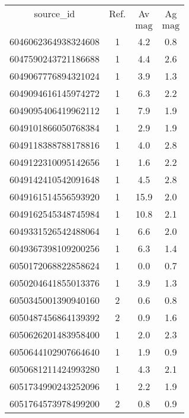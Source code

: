 \begin{table}
\begin{tabular}{cccc}
source_id & Ref. & Av & Ag \\
 &  & $\mathrm{mag}$ & $\mathrm{mag}$ \\
6046062364938324608 & 1 & 4.2 & 0.8 \\
6047590243721186688 & 1 & 4.4 & 2.6 \\
6049067776894321024 & 1 & 3.9 & 1.3 \\
6049094616145974272 & 1 & 6.3 & 2.2 \\
6049095406419962112 & 1 & 7.9 & 1.9 \\
6049101866050768384 & 1 & 2.9 & 1.9 \\
6049118388788178816 & 1 & 4.0 & 2.8 \\
6049122310095142656 & 1 & 1.6 & 2.2 \\
6049142410542091648 & 1 & 4.5 & 2.8 \\
6049161514556593920 & 1 & 15.9 & 2.0 \\
6049162545348745984 & 1 & 10.8 & 2.1 \\
6049331526542488064 & 1 & 6.6 & 2.0 \\
6049367398109200256 & 1 & 6.3 & 1.4 \\
6050172068822858624 & 1 & 0.0 & 0.7 \\
6050204641855013376 & 1 & 3.9 & 1.3 \\
6050345001390940160 & 2 & 0.6 & 0.8 \\
6050487456864139392 & 2 & 0.9 & 1.6 \\
6050626201483958400 & 1 & 2.0 & 2.3 \\
6050644102907664640 & 1 & 1.9 & 0.9 \\
6050681211424993280 & 1 & 4.3 & 2.1 \\
6051734990243252096 & 1 & 2.2 & 1.9 \\
6051764573978499200 & 2 & 0.8 & 0.9 \\
\end{tabular}
\end{table}
